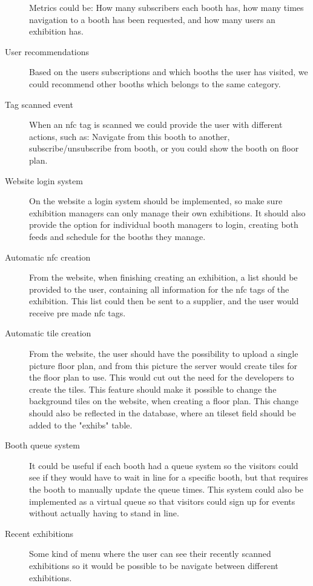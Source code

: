 \begin{description}
Metrics could be: How many subscribers each booth has, how many times navigation to a booth has been requested, and how many users an exhibition has.
\item[User recommendations] Based on the users subscriptions and which booths the user has visited, we could recommend other booths which belongs to the same category.
\item[Tag scanned event] When an \ac{nfc} tag is scanned we could provide the user with different actions, such as: Navigate from this booth to another, subscribe/unsubscribe from booth, or you could show the booth on floor plan.
\item[Website login system] On the website a login system should be implemented, so make sure exhibition managers can only manage their own exhibitions. It should also provide the option for individual booth managers to login, creating both feeds and schedule for the booths they manage.
\item[Automatic \ac{nfc} creation] From the website, when finishing creating an exhibition, a list should be provided to the user, containing all information for the \ac{nfc} tags of the exhibition. This list could then be sent to a supplier, and the user would receive pre made \ac{nfc} tags.
\item[Automatic tile creation] From the website, the user should have the possibility to upload a single picture floor plan, and from this picture the server would create tiles for the floor plan to use. This would cut out the need for the developers to create the tiles. This feature should make it possible to change the background tiles on the website, when creating a floor plan. This change should also be reflected in the database, where an tileset field should be added to the "exhibs" table.
\item[Booth queue system] It could be useful if each booth had a queue system so the visitors could see if they would have to wait in line for a specific booth, but that requires the booth to manually update the queue times. This system could also be implemented as a virtual queue so that visitors could sign up for events without actually having to stand in line.
\item[Recent exhibitions] Some kind of menu where the user can see their recently scanned exhibitions so it would be possible to be navigate between different exhibitions. 

\end{description}
